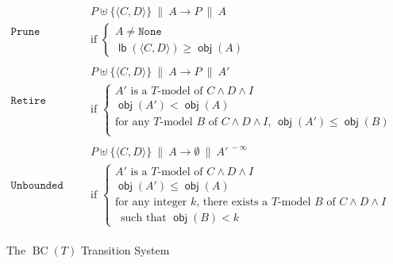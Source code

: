 \documentclass{llncs}
\newcommand\none[0]{\ensuremath{\mathtt{None}}}
\newcommand{\tr}[1]{\ensuremath{\mathtt{#1}}}
\newcommand{\state}[2]{\ensuremath{#1\ \|\ #2}}
\newcommand{\subp}[2]{\ensuremath{\langle#1, #2\rangle}}
\newcommand{\trans}[0]{\ensuremath{ \longrightarrow }}
\newcommand{\cd}{\subp{C}{D}}
\newcommand{\pa}{\state{P}{A}}
\newcommand{\bct}[0]{\ensuremath{\operatorname{BC}(T)}}
\newcommand{\obj}[1]{\ensuremath{\operatorname{\mathsf{obj}}(#1)}}
\newcommand{\lb}[1]{\ensuremath{\operatorname{\mathsf{lb}}(#1)}}
\begin{document}
\begin{figure}[t!]
\begin{align*}
    \tr{Prune}\ \ &
    \begin{aligned}
      & \state{P \uplus \{ \cd \}}{A} \trans \pa \\
      & \text{if }
      \left\{
        \begin{array}{l}
          A \neq \none \\
          \lb{\cd} \geq \obj{A}
        \end{array}
      \right.
    \end{aligned} \\[8pt]
    \tr{Retire}\ \ &
    \begin{aligned}
      & \state{P \uplus \{ \cd \}}{A} \trans \state{P}{A'} \\
      & \text{if }
      \left\{
        \begin{array}{l}
          A' \text{ is a $T$-model of } C \wedge D \wedge I \\
          \obj{A'} < \obj{A} \\
          \text{for any $T$-model $B$ of $C \wedge D
            \wedge I$, $\obj{A'} \leq \obj{B}$} \\
\end{array}
      \right.
    \end{aligned} \\[8pt]
    \tr{Unbounded}\ \ &
    \begin{aligned}
      & \state{P \uplus \{ \cd \}}{A} \trans
      \state{\emptyset}{A'^{\ -\infty}} \\
      & \text{if } \left\{
        \begin{array}{l}
          A' \text{ is a $T$-model of } C \wedge D \wedge I \\
          \obj{A'} \leq \obj{A} \\
          \text{for any integer $k$, there exists a
            $T$-model $B$ of $C \wedge D \wedge I$} \\
          \hspace{6pt}\text{such that $\obj{B} < k$}
        \end{array}
      \right.
    \end{aligned}
  \end{align*}
  \caption{The \bct{} Transition System}
  \label{fig:bct-trans}
\end{figure}
\end{document}
